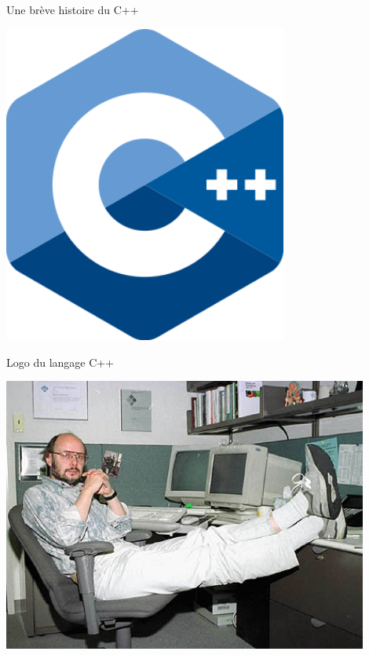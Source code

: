 \begin{frame}{Une brève histoire du C++}

\begin{minipage}{0.33\textwidth}
  \centering
  
  \includegraphics[width=0.7\textwidth]{images/cpp.png}
  
  {\footnotesize Logo du langage C++}
  \medskip
  
  \includegraphics[width=0.9\textwidth]{images/bjarne.jpg}
  

\end{minipage}
\end{frame}

